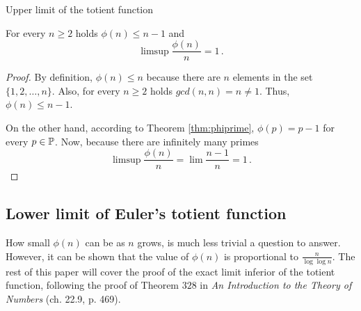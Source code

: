 \documentclass{article}
\begin{document}
\begin{theorem}
Upper limit of the totient function \emph{\cite{HardyWright}}

For every $n \geq 2$ holds $\phi(n) \leq n-1$ and
\begin{equation*}
    \limsup{\frac{\phi(n)}{n}} = 1\,.
\end{equation*}

\begin{proof}

By definition, $\phi(n) \leq n$ because there are $n$ elements in the set $\{1,2,\dots,n\}$. Also, for every $n \geq 2$ holds $gcd(n,n) = n \neq 1$. Thus, $\phi(n) \leq n-1$.

On the other hand, according to Theorem \ref{thm:phiprime}, $\phi(p) = p-1$ for every $p\in\mathbb{P}$.
Now, because there are infinitely many primes %
\begin{equation*}
    \limsup{\frac{\phi(n)}{n}} = \lim \frac{n-1}{n} = 1\,.
\end{equation*}

\end{proof}

\end{theorem}

\subsection{Lower limit of Euler's totient function}

How small $\phi(n)$ can be as $n$ grows, is much less trivial a question to answer. However, it can be shown that the value of $\phi(n)$ is proportional to $\frac{n}{\log\log n}$. The rest of this paper will cover the proof of the exact limit inferior of the totient function, following the proof of Theorem $328$
in \textit{An Introduction to the Theory of Numbers} \cite{HardyWright} (ch. 22.9, p. 469).
\end{document}
